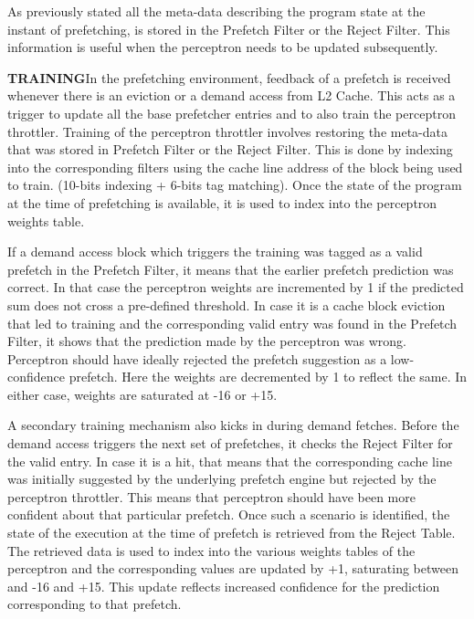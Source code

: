 As previously stated all the meta-data describing the program state at the
instant of prefetching, is stored in the Prefetch Filter or the Reject Filter.  
This information is useful when the perceptron needs to be updated subsequently.

\textbf{TRAINING}\newline In the prefetching environment, feedback of
a prefetch is received whenever there is an eviction or a demand
access from L2 Cache.  This acts as a trigger to update all the
base prefetcher entries and to also train the perceptron throttler.
Training of the perceptron throttler involves restoring the meta-data
that was stored in Prefetch Filter or the Reject Filter.  This is done
by indexing into the corresponding filters using the cache line
address of the block being used to train. (10-bits indexing + 6-bits
tag matching).  Once the state of the program at the time of
prefetching is available, it is used to index into the perceptron
weights table.

If a demand access block which triggers the training was tagged as a
valid prefetch in the Prefetch Filter, it means that the earlier
prefetch prediction was correct.  In that case the perceptron weights
are incremented by 1 if the predicted sum does not cross a pre-defined
threshold.  In case it is a cache block eviction that led to training
and the corresponding valid entry was found in the Prefetch Filter, it
shows that the prediction made by the perceptron was wrong.
Perceptron should have ideally rejected the prefetch suggestion as a
low-confidence prefetch.  Here the weights are decremented by 1 to
reflect the same.  In either case, weights are saturated at -16 or
+15.

A secondary training mechanism also kicks in during demand fetches.
Before the demand access triggers the next set of prefetches, it
checks the Reject Filter for the valid entry.  In case it is a hit,
that means that the corresponding cache line was initially suggested
by the underlying prefetch engine but rejected by the perceptron throttler.
This means that perceptron should have been more confident about that
particular prefetch.  Once such a scenario is identified, the state of
the execution at the time of prefetch is retrieved from the Reject
Table.  The retrieved data is used to index into the various weights
tables of the perceptron and the corresponding values are updated by
+1, saturating between and -16 and +15.  This update reflects
increased confidence for the prediction corresponding to that
prefetch.

